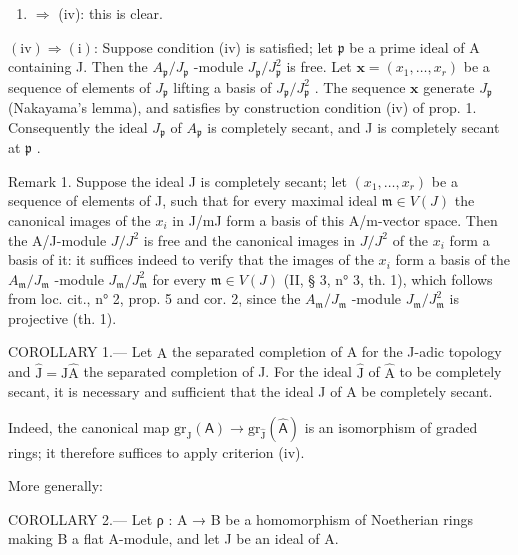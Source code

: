 \begin{enumerate}
\def\labelenumi{(\roman{enumi})}
\setcounter{enumi}{2}
\tightlist
\item
  \(\Rightarrow\) (iv): this is clear.
\end{enumerate}

\((\mathrm{iv}) \Rightarrow (\mathrm{i})\): Suppose condition (iv) is satisfied; let \(\mathfrak{p}\) be a prime ideal of A containing J. Then the \(A_{\mathfrak{p}} / J_{\mathfrak{p}}\) -module \(J_{\mathfrak{p}} / J_{\mathfrak{p}}^2\) is free. Let \(\mathbf{x} = (x_1, \ldots, x_r)\) be a sequence of elements of \(J_{\mathfrak{p}}\) lifting a basis of \(J_{\mathfrak{p}} / J_{\mathfrak{p}}^2\) . The sequence \(\mathbf{x}\) generate \(J_{\mathfrak{p}}\) (Nakayama's lemma), and satisfies by construction condition (iv) of prop. 1. Consequently the ideal \(J_{\mathfrak{p}}\) of \(A_{\mathfrak{p}}\) is completely secant, and J is completely secant at \(\mathfrak{p}\) .

Remark 1. Suppose the ideal J is completely secant; let \((x_1, \ldots, x_r)\) be a sequence of elements of J, such that for every maximal ideal \(\mathfrak{m} \in V(J)\) the canonical images of the \(x_i\) in J/mJ form a basis of this A/m-vector space. Then the A/J-module \(J/J^2\) is free and the canonical images in \(J/J^2\) of the \(x_i\) form a basis of it: it suffices indeed to verify that the images of the \(x_i\) form a basis of the \(A_{\mathfrak{m}}/J_{\mathfrak{m}}\) -module \(J_{\mathfrak{m}}/J_{\mathfrak{m}}^2\) for every \(\mathfrak{m} \in V(J)\) (II, § 3, n° 3, th. 1), which follows from loc. cit., n° 2, prop. 5 and cor. 2, since the \(A_{\mathfrak{m}}/J_{\mathfrak{m}}\) -module \(J_{\mathfrak{m}}/J_{\mathfrak{m}}^2\) is projective (th. 1).

COROLLARY 1.--- Let \(\widehat{\mathrm{A}}\) the separated completion of A for the J-adic topology and \(\widehat{\mathrm{J}} = \mathrm{J}\widehat{\mathrm{A}}\) the separated completion of J. For the ideal \(\widehat{\mathrm{J}}\) of \(\widehat{\mathrm{A}}\) to be completely secant, it is necessary and sufficient that the ideal J of A be completely secant.

Indeed, the canonical map \(\mathrm{gr}_{\mathrm{J}}(\mathsf{A}) \to \mathrm{gr}_{\widehat{\mathrm{J}}}(\widehat{\mathsf{A}})\) is an isomorphism of graded rings; it therefore suffices to apply criterion (iv).

More generally:

COROLLARY 2.--- Let ρ : A → B be a homomorphism of Noetherian rings making B a flat A-module, and let J be an ideal of A.

